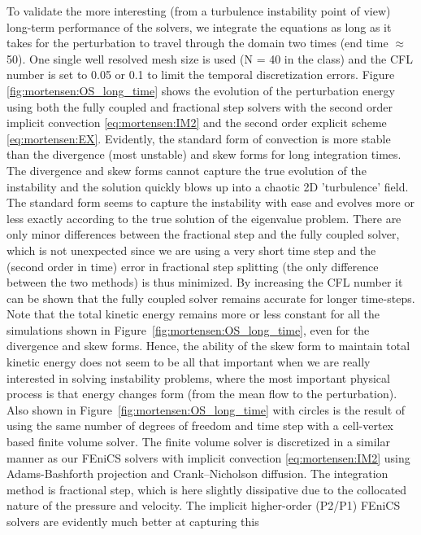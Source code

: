 To validate the more interesting (from a turbulence instability point of
view) long-term performance of the solvers, we integrate the equations
as long as it takes for the perturbation to travel through the domain
two times (end time $\approx$ 50). One single well resolved mesh size
is used (N = 40 in the  class) and the CFL number is
set to 0.05 or 0.1 to limit the temporal discretization errors. Figure
\ref{fig:mortensen:OS_long_time} shows the evolution of the perturbation
energy using both the fully coupled and fractional step solvers with
the second order implicit convection \eqref{eq:mortensen:IM2} and the
second order explicit scheme \eqref{eq:mortensen:EX}. Evidently, the
standard form of convection is more stable than the divergence (most
unstable) and skew forms for long integration times. The divergence and
skew forms cannot capture the true evolution of the instability and the
solution quickly blows up into a chaotic 2D 'turbulence' field. The
standard form seems to capture the instability with ease and evolves
more or less exactly according to the true solution of the eigenvalue
problem. There are only minor differences between the fractional step
and the fully coupled solver, which is not unexpected since we are
using a very short time step and the (second order in time) error in
fractional step splitting (the only difference between the two methods)
is thus minimized. By increasing the CFL number it can be shown that the
fully coupled solver remains accurate for longer time-steps. Note that the
total kinetic energy remains more or less constant for all the simulations
shown in Figure~\ref{fig:mortensen:OS_long_time}, even for the divergence
and skew forms. Hence, the ability of the skew form to maintain total
kinetic energy does not seem to be all that important when we are really
interested in solving instability problems, where the most important
physical process is that energy changes form (from the mean flow to the
perturbation). Also shown in Figure~\ref{fig:mortensen:OS_long_time}
with circles is the result of using the same number of degrees of freedom
and time step with a cell-vertex based finite volume solver. The finite
volume solver is discretized in a similar manner as our FEniCS solvers
with implicit convection \eqref{eq:mortensen:IM2} using Adams-Bashforth
projection and Crank--Nicholson diffusion. The integration method
is fractional step, which is here slightly dissipative due to the
collocated nature of the pressure and velocity. The implicit higher-order
(P2/P1) FEniCS solvers are evidently much better at capturing this
